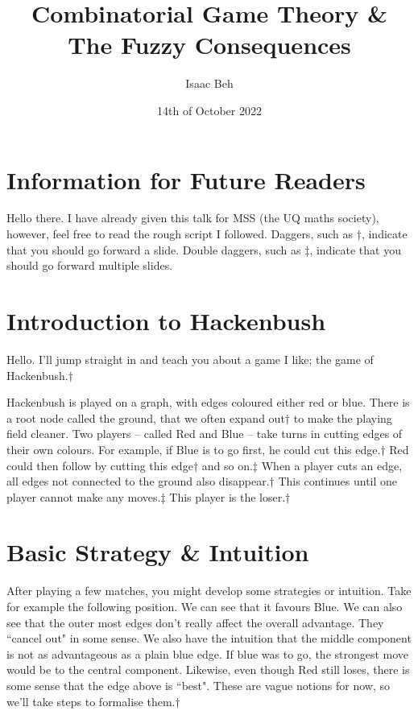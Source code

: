 \documentclass[]{article}
\title{Combinatorial Game Theory \& The Fuzzy Consequences}
\author{Isaac Beh}
\date{14th of October 2022}
\newcommand{\nextslide}{$\dagger$}
\newcommand{\nextslides}{$\ddagger$}
\begin{document}
\maketitle

\setcounter{section}{-1}
\section{Information for Future Readers}
Hello there. I have already given this talk for MSS (the UQ maths society), however, feel free to read the rough script I followed. Daggers, such as \nextslide{}, indicate that you should go forward a slide. Double daggers, such as \nextslides{}, indicate that you should go forward multiple slides.

\section{Introduction to Hackenbush}
Hello. I'll jump straight in and teach you about a game I like; the game of Hackenbush.\nextslide{}

Hackenbush is played on a graph, with edges coloured either red or blue. There is a root node called the ground, that we often expand out\nextslide{} to make the playing field cleaner. Two players -- called Red and Blue -- take turns in cutting edges of their own colours. For example, if Blue is to go first, he could cut this edge.\nextslide{} Red could then follow by cutting this edge\nextslide{} and so on.\nextslides{} When a player cuts an edge, all edges not connected to the ground also disappear.\nextslide{} This continues until one player cannot make any moves.\nextslides{} This player is the loser.\nextslide{}

\section{Basic Strategy \& Intuition}
After playing a few matches, you might develop some strategies or intuition. Take for example the following position. We can see that it favours Blue. We can also see that the outer most edges don't really affect the overall advantage. They ``cancel out" in some sense. We also have the intuition that the middle component is not as advantageous as a plain blue edge. If blue was to go, the strongest move would be to the central component. Likewise, even though Red still loses, there is some sense that the edge above is ``best". These are vague notions for now, so we'll take steps to formalise them.\nextslide{}
\end{document}
